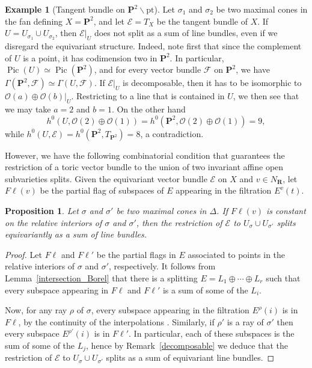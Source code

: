 \documentclass[12pt]{amsart}
\newtheorem{proposition}[lemma]{Proposition}
\theoremstyle{definition}
\newtheorem{example}[lemma]{Example}
\theoremstyle{remark}
\begin{document}
\begin{example}[Tangent bundle on ${{\mathbf P}}^2 \smallsetminus \mathrm{pt}$]
Let $\sigma_1$ and $\sigma_2$ be two maximal cones in the fan
defining $X={{\mathbf P}}^2$, and let ${\mathcal{E}}=T_X$ be the tangent bundle of $X$.
If $U=U_{\sigma_1}\cup U_{\sigma_2}$, then ${\mathcal{E}}\vert_U$ does not
split as a sum of line bundles, even if we disregard the equivariant
structure. Indeed, note first that since the complement of $U$ is a
point, it has codimension two in ${{\mathbf P}}^2$. In particular,
$\operatorname{Pic}(U)\simeq\operatorname{Pic}({{\mathbf P}}^2)$, and for every vector bundle ${\mathcal{F}}$ on
${{\mathbf P}}^2$, we have $\Gamma({{\mathbf P}}^2,{\mathcal{F}})\simeq\Gamma(U,{\mathcal{F}})$.  If ${\mathcal{E}}\vert_U$ is decomposable, then it has to be isomorphic to
${\mathcal{O}}(a)\oplus{\mathcal{O}}(b)\vert_U$. Restricting to a line that is contained
in $U$, we then see that we may take $a=2$ and $b=1$. On the other
hand
$$h^0(U,{\mathcal{O}}(2)\oplus{\mathcal{O}}(1))=h^0({{\mathbf P}}^2,{\mathcal{O}}(2)\oplus{\mathcal{O}}(1))=9,$$
while $h^0(U,{\mathcal{E}})=h^0({{\mathbf P}}^2,T_{{{\mathbf P}}^2})=8$, a contradiction.
\end{example}

\noindent  However, we have the following combinatorial condition
that guarantees the restriction of a toric vector bundle to the
union of two invariant affine open subvarieties splits. Given the
equivariant vector bundle ${\mathcal{E}}$ on $X$ and $v \in N_{{\mathbf R}}$, let
${F\ell}(v)$ be the partial flag of subspaces of $E$ appearing in the
filtration $E^v(t)$.

\begin{proposition} \label{two affines}
Let $\sigma$ and $\sigma'$ be two maximal cones in $\Delta$. If
${F\ell}(v)$ is constant on the relative interiors of $\sigma$ and
$\sigma'$, then the restriction of ${\mathcal{E}}$ to $U_\sigma \cup
U_{\sigma'}$ splits equivariantly as a sum of line bundles.
\end{proposition}

\begin{proof}
Let ${F\ell}$ and ${F\ell}'$ be the partial flags in $E$ associated to
points in the relative interiors of $\sigma$ and $\sigma'$,
respectively. It follows from Lemma~\ref{intersection_Borel} that
there is a splitting $E = L_1 \oplus \cdots \oplus L_r$ such that
every subspace appearing in
 ${F\ell}$ and ${F\ell}'$ is a sum of some of the $L_i$.

Now, for any ray $\rho$ of $\sigma$, every subspace appearing in the
filtration $E^\rho(i)$ is in ${F\ell}$, by the continuity of the
interpolations \cite[Lemma~4.7]{Payne}.  Similarly, if $\rho'$ is a
ray of $\sigma'$ then every subspace $E^{\rho'}(i)$ is in ${F\ell}'$. In
particular, each of these subspaces is the sum of some of the $L_j$,
hence by Remark~\ref{decomposable} we deduce that the restriction of
${\mathcal{E}}$ to $U_{\sigma}\cup U_{\sigma'}$ splits as a sum of equivariant
line bundles.
\end{proof}
\end{document}
